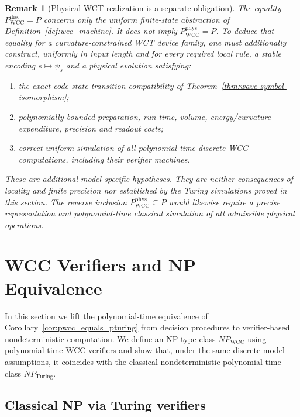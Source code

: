\documentclass[12pt]{article}
\newtheorem{remark}[theorem]{Remark}
\begin{document}
\begin{remark}[Physical WCT realization is a separate obligation]
\label{rem:wct_realization}
The equality $P_{\mathrm{WCC}}^{\mathrm{disc}}=P$ concerns only the
uniform finite-state abstraction of Definition~\ref{def:wcc_machine}.
It does \emph{not} imply $P_{\mathrm{WCC}}^{\mathrm{phys}}=P$.
To deduce that equality for a curvature-constrained WCT device family,
one must additionally construct, uniformly in input length and
for every required local rule, a stable encoding $s\mapsto\psi_s$ and
a physical evolution satisfying:
\begin{enumerate}
\item the exact code-state transition compatibility of
Theorem~\ref{thm:wave-symbol-isomorphism};
\item polynomially bounded preparation, run time, volume,
energy/curvature expenditure, precision and readout costs;
\item correct uniform simulation of all polynomial-time discrete
WCC computations, including their verifier machines.
\end{enumerate}
These are additional model-specific hypotheses. They are neither
consequences of locality and finite precision nor established by the
Turing simulations proved in this section. The reverse inclusion
$P_{\mathrm{WCC}}^{\mathrm{phys}}\subseteq P$ would likewise require
a precise representation and polynomial-time classical simulation of
all admissible physical operations.


\end{remark}


\section{WCC Verifiers and NP Equivalence}
\label{sec:np_wcc_equiv}

In this section we lift the polynomial-time equivalence of
Corollary~\ref{cor:pwcc_equals_pturing} from decision procedures to
verifier-based nondeterministic computation. We define an NP-type class
$NP_{\mathrm{WCC}}$ using polynomial-time WCC verifiers and show that, under the
same discrete model assumptions, it coincides with the classical
nondeterministic polynomial-time class $NP_{\mathrm{Turing}}$.

\subsection{Classical NP via Turing verifiers}
\end{document}
